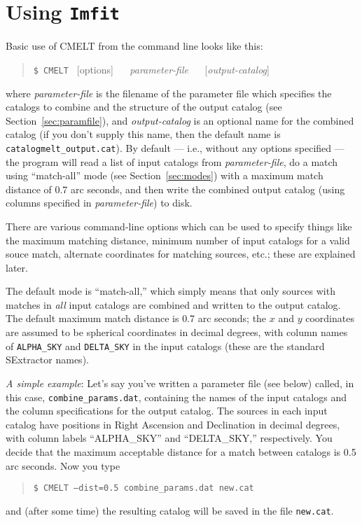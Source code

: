 \documentclass[10pt]{article}
\newcommand{\Imfit}{\texttt{Imfit}}
\begin{document}
\section{Using \Imfit{}}

Basic use of CMELT from the command line looks like this:
\begin{quote}
  \texttt{\$ CMELT }  [options] ~~ \textit{parameter-file} ~~
  [\textit{output-catalog}]
\end{quote}
where \textit{parameter-file} is the filename of the parameter file
which specifies the catalogs to combine and the structure of the
output catalog (see Section~\ref{sec:paramfile}), and
\textit{output-catalog} is an optional name for the combined catalog
(if you don't supply this name, then the default name is
\texttt{catalogmelt\_output.cat}).  By default --- i.e., without any
options specified --- the program will read a list of input catalogs
from \textit{parameter-file}, do a match using ``match-all'' mode (see
Section~\ref{sec:modes}) with a maximum match distance of 0.7 arc
seconds, and then write the combined output catalog (using columns
specified in \textit{parameter-file}) to disk.

There are various command-line options which can be used to specify
things like the maximum matching distance, minimum number of input
catalogs for a valid souce match, alternate coordinates for matching
sources, etc.; these are explained later.

The default mode is ``match-all,'' which simply means that only
sources with matches in \textit{all} input catalogs are combined and
written to the output catalog.  The default maximum match distance is
0.7 arc seconds; the $x$ and $y$ coordinates are assumed to be
spherical coordinates in decimal degrees, with column names of
\texttt{ALPHA\_SKY} and \texttt{DELTA\_SKY} in the input catalogs
(these are the standard SExtractor names).

\textit{A simple example}: Let's say you've written a parameter file
(see below) called, in this case, \texttt{combine\_params.dat},
containing the names of the input catalogs and the column
specifications for the output catalog.  The sources in each input
catalog have positions in Right Ascension and Declination in decimal
degrees, with column labels ``ALPHA\_SKY'' and ``DELTA\_SKY,''
respectively.  You decide that the maximum acceptable distance for a
match between catalogs is 0.5 arc seconds.  Now you type
\begin{quote}
  \texttt{\$ CMELT --dist=0.5 combine\_params.dat new.cat}
\end{quote}
and (after some time) the resulting catalog will be saved in the 
file \texttt{new.cat}.
\end{document}
